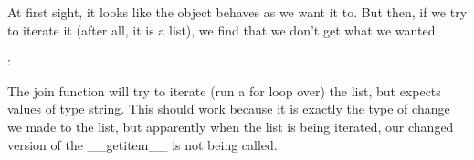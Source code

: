 \documentclass[a4paper,10pt,english]{sphinxmanual}
\begin{document}
\begin{sphinxVerbatim}[commandchars=\\\{\}]
 
       
           
              
              
              
          \PYG{l+s+s2}{[}\PYG{l+s+s2}{] }
\end{sphinxVerbatim}

At first sight, it looks like the object behaves as we want it to. But then, if we try to iterate it (after all, it is a
list), we find that we don’t get what we wanted:

\begin{sphinxVerbatim}[commandchars=\\\{\}]
       
\PYG{p}{[}\PYG{p}{]}
\PYG{p}{[}\PYG{p}{]}
: 
\end{sphinxVerbatim}

The join function will try to iterate (run a for loop over) the list, but expects values of type string. This should
work because it is exactly the type of change we made to the list, but apparently when the list is being iterated, our
changed version of the \_\_getitem\_\_ is not being called.
\end{document}
